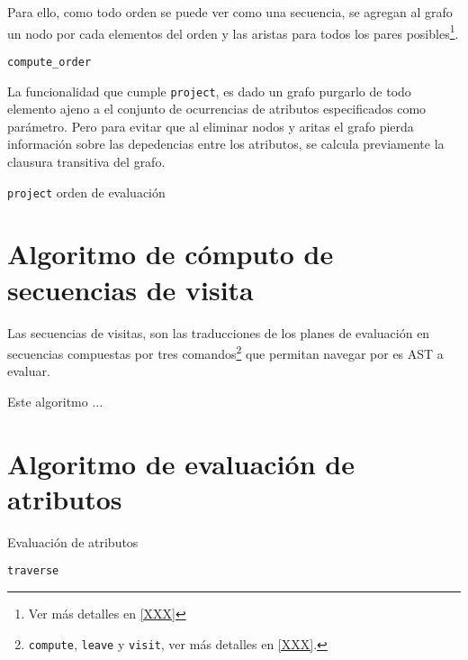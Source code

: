 Para ello, como todo orden se puede ver como una secuencia, se agregan al grafo un nodo por cada elementos del orden y las aristas para todos los pares posibles\footnote{Ver más detalles en \ref{XXX}}.

\begin{algorithm}[H]

\caption{\texttt{compute\_order}}
\end{algorithm}

La funcionalidad que cumple \texttt{project}, es dado un grafo purgarlo de todo elemento ajeno a el conjunto de ocurrencias de atributos especificados como parámetro. Pero para evitar que al eliminar nodos y aritas el grafo pierda información sobre las depedencias entre los atributos, se calcula previamente la clausura transitiva del grafo.

\begin{algorithm}[H]

\caption{\texttt{project} orden de evaluación}
\end{algorithm}

\section{Algoritmo de cómputo de secuencias de visita}

Las secuencias de visitas, son las traducciones de los planes de evaluación en secuencias compuestas por tres comandos\footnote{\texttt{compute}, \texttt{leave} y \texttt{visit}, ver más detalles en \ref{XXX}.} que permitan navegar por es AST a evaluar.

Este algoritmo ...

\section{Algoritmo de evaluación de atributos}

\begin{algorithm}[H]

\caption{Evaluación de atributos}
\end{algorithm}

\begin{algorithm}[H]

\caption{\texttt{traverse}}
\end{algorithm}